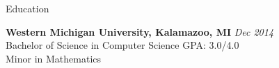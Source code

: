 \documentclass{resume} %
\begin{document}
\begin{rSection}{Education}

{\bf Western Michigan University, Kalamazoo, MI} \hfill {\em Dec 2014} \\ 
Bachelor of Science in Computer Science \hfill GPA: 3.0/4.0 \\
Minor in Mathematics \\


\end{rSection}

\end{document}
